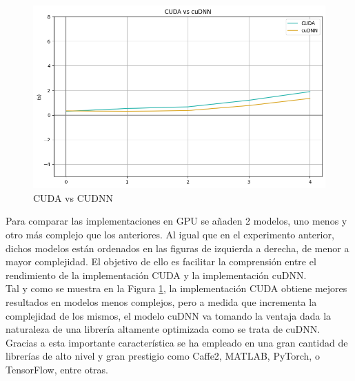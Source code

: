 \begin{figure}[H]
	\centering
	\includegraphics[scale=0.52]{imagenes/cuda_cudnn_1.png}  
	\caption{CUDA vs CUDNN}
	\label{fig:cuda_cudnn_1}
\end{figure}

Para comparar las implementaciones en GPU se añaden 2 modelos, uno menos y otro más complejo que los anteriores. Al igual que en el experimento anterior, dichos modelos están ordenados en las figuras de izquierda a derecha, de menor a mayor complejidad. El objetivo de ello es facilitar la comprensión entre el rendimiento de la implementación CUDA y la implementación cuDNN. \\
Tal y como se muestra en la Figura \ref{fig:cuda_cudnn_1}, la implementación CUDA obtiene mejores resultados en modelos menos complejos, pero a medida que incrementa la complejidad de los mismos, el modelo cuDNN va tomando la ventaja dada la naturaleza de una librería altamente optimizada como se trata de cuDNN. Gracias a esta importante característica se ha empleado en una gran cantidad de librerías de alto nivel y gran prestigio como Caffe2, MATLAB, PyTorch, o TensorFlow, entre otras. 


